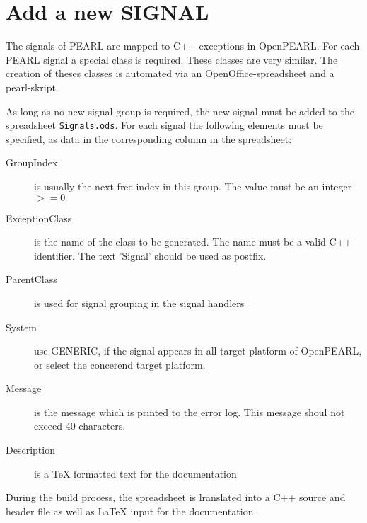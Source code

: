 \section{Add a new SIGNAL}
The signals of PEARL are mapped to C++ exceptions in OpenPEARL.
For each PEARL signal a special class is required.
These classes are very similar. The creation of theses classes
is automated via an OpenOffice-spreadsheet and a pearl-skript.

As long as no new signal group is required, the new signal
must be added to the spreadsheet \texttt{Signals.ods}.
For each signal the following elements must be specified, as 
data in the corresponding column in the spreadsheet:
\begin{description} 
\item[GroupIndex] is usually the next free index in this group.
   The value must be an integer $>= 0$
\item [ExceptionClass] is the name of the class to be generated.
   The name must be a valid C++ identifier. The text 'Signal' should
   be used as postfix.
\item[ParentClass] is used for signal grouping in the signal handlers
\item[System] use GENERIC, if the signal appears in all target
   platform of OpenPEARL, or select the concerend target platform.
\item[Message] is the message which is printed to the error log.
   This message shoul not exceed 40 characters.
\item[Description] is a TeX formatted text for the documentation
\end{description}

During the build process, the spreadsheet is lranslated into a C++ source
and  header file as well as LaTeX input for the documentation.
